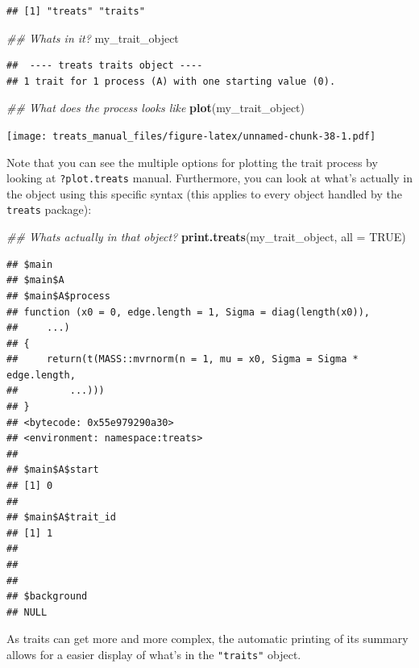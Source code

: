 \documentclass[
]{book}
\newenvironment{Shaded}{\begin{snugshade}}{\end{snugshade}}
\newcommand{\CommentTok}[1]{\textcolor[rgb]{0.56,0.35,0.01}{\textit{#1}}}
\newcommand{\DataTypeTok}[1]{\textcolor[rgb]{0.13,0.29,0.53}{#1}}
\newcommand{\KeywordTok}[1]{\textcolor[rgb]{0.13,0.29,0.53}{\textbf{#1}}}
\newcommand{\NormalTok}[1]{#1}
\newcommand{\OtherTok}[1]{\textcolor[rgb]{0.56,0.35,0.01}{#1}}
\begin{document}
\begin{verbatim}
## [1] "treats" "traits"
\end{verbatim}

\begin{Shaded}
\begin{Highlighting}[]
\CommentTok{\#\# What\textquotesingle{}s in it?}
\NormalTok{my\_trait\_object}
\end{Highlighting}
\end{Shaded}

\begin{verbatim}
##  ---- treats traits object ---- 
## 1 trait for 1 process (A) with one starting value (0).
\end{verbatim}

\begin{Shaded}
\begin{Highlighting}[]
\CommentTok{\#\# What does the process looks like}
\KeywordTok{plot}\NormalTok{(my\_trait\_object)}
\end{Highlighting}
\end{Shaded}

\texttt{[image: treats\_manual\_files/figure-latex/unnamed-chunk-38-1.pdf]}

Note that you can see the multiple options for plotting the trait process by looking at \texttt{?plot.treats} manual. Furthermore, you can look at what's actually in the object using this specific syntax (this applies to every object handled by the \texttt{treats} package):

\begin{Shaded}
\begin{Highlighting}[]
\CommentTok{\#\# What\textquotesingle{}s actually in that object?}
\KeywordTok{print.treats}\NormalTok{(my\_trait\_object, }\DataTypeTok{all =} \OtherTok{TRUE}\NormalTok{)}
\end{Highlighting}
\end{Shaded}

\begin{verbatim}
## $main
## $main$A
## $main$A$process
## function (x0 = 0, edge.length = 1, Sigma = diag(length(x0)), 
##     ...) 
## {
##     return(t(MASS::mvrnorm(n = 1, mu = x0, Sigma = Sigma * edge.length, 
##         ...)))
## }
## <bytecode: 0x55e979290a30>
## <environment: namespace:treats>
## 
## $main$A$start
## [1] 0
## 
## $main$A$trait_id
## [1] 1
## 
## 
## 
## $background
## NULL
\end{verbatim}

As traits can get more and more complex, the automatic printing of its summary allows for a easier display of what's in the \texttt{"traits"} object.
\end{document}

